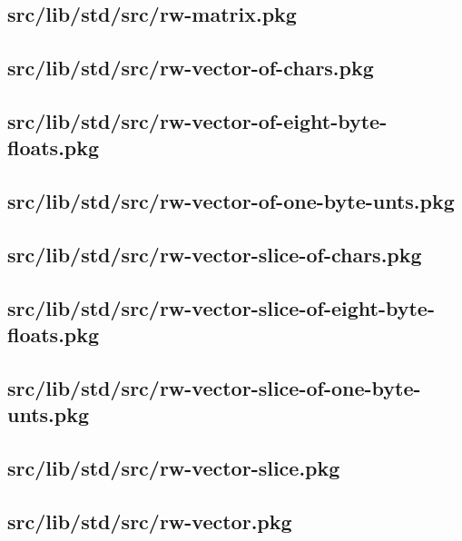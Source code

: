 \subsection{src/lib/std/src/rw-matrix.pkg}


\subsection{src/lib/std/src/rw-vector-of-chars.pkg}


\subsection{src/lib/std/src/rw-vector-of-eight-byte-floats.pkg}


\subsection{src/lib/std/src/rw-vector-of-one-byte-unts.pkg}


\subsection{src/lib/std/src/rw-vector-slice-of-chars.pkg}


\subsection{src/lib/std/src/rw-vector-slice-of-eight-byte-floats.pkg}


\subsection{src/lib/std/src/rw-vector-slice-of-one-byte-unts.pkg}


\subsection{src/lib/std/src/rw-vector-slice.pkg}


\subsection{src/lib/std/src/rw-vector.pkg}


